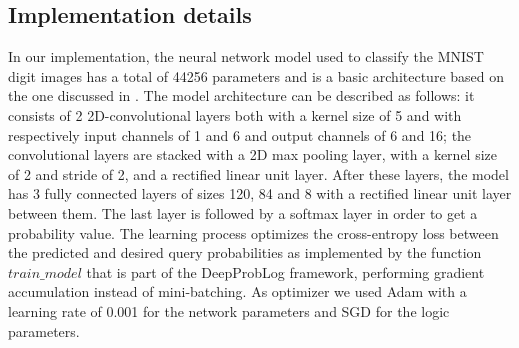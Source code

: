 \subsection{Implementation details}
In our implementation, the neural network model used to classify the MNIST digit images has a total of 44256 parameters and is a basic architecture based on the one discussed in \cite{DeepProbLog}. The model architecture can be described as follows: it consists of 2 2D-convolutional layers both with a kernel size of 5 and with respectively input channels of 1 and 6 and output channels of 6 and 16; the convolutional layers are stacked with a 2D max pooling layer, with a kernel size of 2 and stride of 2, and a rectified linear unit layer.
After these layers, the model has 3 fully connected layers of sizes 120, 84 and 8 with a rectified linear unit layer between them. The last layer is followed by a softmax layer in order to get a probability value.
The learning process optimizes the cross-entropy loss between the predicted and desired query probabilities as implemented by the function $train\_model$ that is part of the DeepProbLog framework, performing gradient accumulation instead of mini-batching.
As optimizer we used Adam with a learning rate of 0.001 for the network parameters and SGD for the logic parameters.
